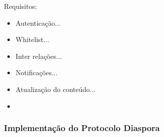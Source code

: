 Requisitos:

\begin{itemize}
  \item{Autenticação...}
  \item{Whitelist...}
  \item{Inter relações...}
  \item{Notificações...}
  \item{Atualização do conteúdo...}
  \item{}
\end{itemize}

\subsubsection{Implementação do Protocolo Diaspora}




